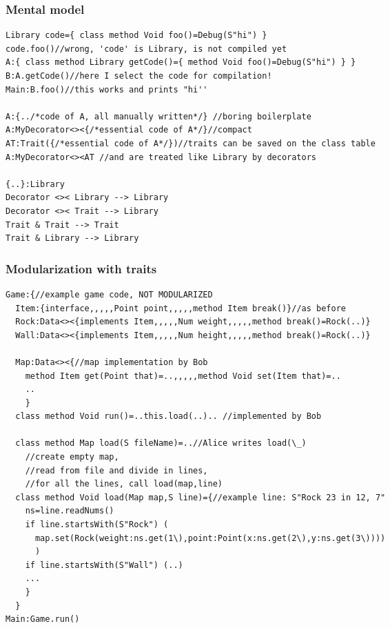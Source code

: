 \begin{frame}[fragile]
\frametitle{Mental model}
\begin{NiceCode}{59ex}{0.8}
\begin{lstlisting}
Library code={ class method Void foo()=Debug(S"hi") }
code.foo()//wrong, 'code' is Library, is not compiled yet
A:{ class method Library getCode()={ method Void foo()=Debug(S"hi") } } 
B:A.getCode()//here I select the code for compilation!
Main:B.foo()//this works and prints "hi''

A:{../*code of A, all manually written*/} //boring boilerplate
A:MyDecorator<><{/*essential code of A*/}//compact
AT:Trait({/*essential code of A*/})//traits can be saved on the class table
A:MyDecorator<><AT //and are treated like Library by decorators
 
{..}:Library
Decorator <>< Library --> Library
Decorator <>< Trait --> Library
Trait & Trait --> Trait
Trait & Library --> Library

\end{lstlisting}
\end{NiceCode}
\end{frame}



\begin{frame}[fragile]
\frametitle{Modularization with traits}
\begin{NiceCode}{59ex}{0.7}
\begin{lstlisting}
Game:{//example game code, NOT MODULARIZED
  Item:{interface,,,,,Point point,,,,,method Item break()}//as before
  Rock:Data<><{implements Item,,,,,Num weight,,,,,method break()=Rock(..)}
  Wall:Data<><{implements Item,,,,,Num height,,,,,method break()=Rock(..)}
  
  Map:Data<><{//map implementation by Bob
    method Item get(Point that)=..,,,,,method Void set(Item that)=..
    ..
    }
  class method Void run()=..this.load(..).. //implemented by Bob
  
  class method Map load(S fileName)=..//Alice writes load(\_)
    //create empty map,
    //read from file and divide in lines,
    //for all the lines, call load(map,line)
  class method Void load(Map map,S line)={//example line: S"Rock 23 in 12, 7"
    ns=line.readNums()
    if line.startsWith(S"Rock") (
      map.set(Rock(weight:ns.get(1\),point:Point(x:ns.get(2\),y:ns.get(3\))))
      )
    if line.startsWith(S"Wall") (..)
    ...
    }
  }
Main:Game.run()
\end{lstlisting}
\end{NiceCode}
\end{frame}



